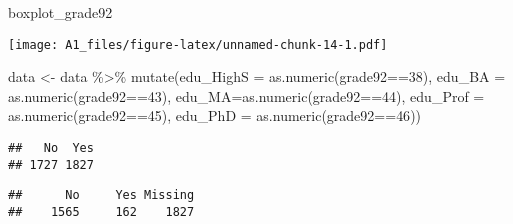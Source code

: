 \documentclass[
]{article}
\newenvironment{Shaded}{\begin{snugshade}}{\end{snugshade}}
\newcommand{\AttributeTok}[1]{\textcolor[rgb]{0.77,0.63,0.00}{#1}}
\newcommand{\CommentTok}[1]{\textcolor[rgb]{0.56,0.35,0.01}{\textit{#1}}}
\newcommand{\DecValTok}[1]{\textcolor[rgb]{0.00,0.00,0.81}{#1}}
\newcommand{\FunctionTok}[1]{\textcolor[rgb]{0.00,0.00,0.00}{#1}}
\newcommand{\NormalTok}[1]{#1}
\newcommand{\OtherTok}[1]{\textcolor[rgb]{0.56,0.35,0.01}{#1}}
\newcommand{\SpecialCharTok}[1]{\textcolor[rgb]{0.00,0.00,0.00}{#1}}
\begin{document}
\begin{Shaded}
\begin{Highlighting}[]
\NormalTok{boxplot\_grade92}
\end{Highlighting}
\end{Shaded}

\texttt{[image: A1\_files/figure-latex/unnamed-chunk-14-1.pdf]}

\begin{Shaded}
\begin{Highlighting}[]
\NormalTok{data  }\OtherTok{\textless{}{-}}\NormalTok{ data }\SpecialCharTok{\%\textgreater{}\%} \FunctionTok{mutate}\NormalTok{(}\AttributeTok{edu\_HighS =} \FunctionTok{as.numeric}\NormalTok{(grade92}\SpecialCharTok{==}\DecValTok{38}\NormalTok{),}
                        \AttributeTok{edu\_BA =} \FunctionTok{as.numeric}\NormalTok{(grade92}\SpecialCharTok{==}\DecValTok{43}\NormalTok{),}
                        \AttributeTok{edu\_MA=}\FunctionTok{as.numeric}\NormalTok{(grade92}\SpecialCharTok{==}\DecValTok{44}\NormalTok{),}
                        \AttributeTok{edu\_Prof =} \FunctionTok{as.numeric}\NormalTok{(grade92}\SpecialCharTok{==}\DecValTok{45}\NormalTok{),}
                        \AttributeTok{edu\_PhD =} \FunctionTok{as.numeric}\NormalTok{(grade92}\SpecialCharTok{==}\DecValTok{46}\NormalTok{))}
\end{Highlighting}
\end{Shaded}

\begin{Shaded}
\end{Shaded}

\begin{verbatim}
##   No  Yes 
## 1727 1827
\end{verbatim}

\begin{Shaded}
\end{Shaded}

\begin{verbatim}
##      No     Yes Missing 
##    1565     162    1827
\end{verbatim}
\end{document}
